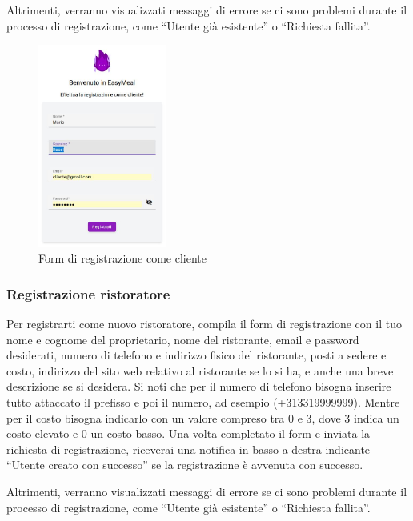 Altrimenti, verranno visualizzati messaggi di errore se ci sono problemi durante il processo di registrazione, come ``Utente già esistente'' o ``Richiesta fallita''.

\begin{figure}[H]
    \centering
    \includegraphics[width=0.375\textwidth]{./img/RegistrazioneCliente.jpg}
    \caption{Form di registrazione come cliente}
\end{figure}

\subsubsection{Registrazione ristoratore}
Per registrarti come nuovo ristoratore, compila il form di registrazione con il tuo nome e cognome del proprietario, nome del ristorante,
email e password desiderati, numero di telefono e indirizzo fisico del ristorante, posti a sedere e costo, indirizzo del sito web relativo al 
ristorante se lo si ha, e anche una breve descrizione se si desidera. 
Si noti che per il numero di telefono bisogna inserire tutto attaccato il prefisso e poi il numero, ad esempio (+313319999999).
Mentre per il costo bisogna indicarlo con un valore compreso tra 0 e 3, dove 3 indica un costo elevato e 0 un costo basso.
Una volta completato il form e inviata la richiesta di registrazione, riceverai una notifica in basso a destra indicante 
``Utente creato con successo'' se la registrazione è avvenuta con successo.

Altrimenti, verranno visualizzati messaggi di errore se ci sono problemi durante il processo di registrazione, come ``Utente già esistente'' o ``Richiesta fallita''.


